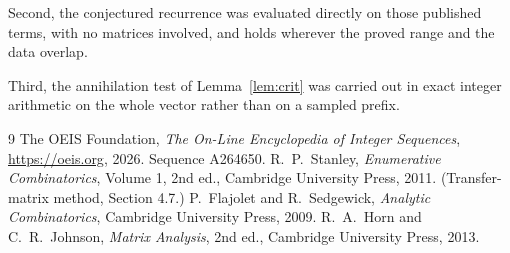 \documentclass[11pt,a4paper]{article}
\theoremstyle{plain}
\theoremstyle{definition}
\begin{document}
Second, the conjectured recurrence was evaluated directly on those published terms, with no
matrices involved, and holds wherever the proved range and the data overlap.

Third, the annihilation test of Lemma~\ref{lem:crit} was carried out in exact integer
arithmetic on the whole vector rather than on a sampled prefix.

\begin{thebibliography}{9}
 The OEIS Foundation, \emph{The On-Line Encyclopedia of Integer
Sequences}, \url{https://oeis.org}, 2026. Sequence A264650.
 R.~P.~Stanley, \emph{Enumerative Combinatorics}, Volume 1, 2nd ed.,
Cambridge University Press, 2011. (Transfer-matrix method, Section 4.7.)
 P.~Flajolet and R.~Sedgewick, \emph{Analytic Combinatorics}, Cambridge
University Press, 2009.
 R.~A.~Horn and C.~R.~Johnson, \emph{Matrix Analysis}, 2nd ed., Cambridge
University Press, 2013.
\end{thebibliography}
\end{document}
